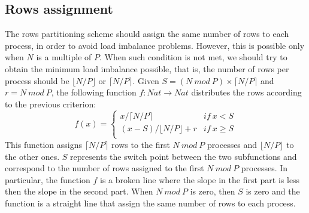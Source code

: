 \documentclass{article}
\begin{document}
\subsection{Rows assignment} \label{sec:rowsassignment}
The rows partitioning scheme should assign the same number of rows to each process, in order to avoid load imbalance problems. However, this is possible only when $N$ is a multiple of $P$. When such condition is not met, we should try to obtain the minimum load imbalance possible, that is, the number of rows per process should be $\lfloor N/P \rfloor$ or $\lceil N/P \rceil$. Given $S = (N~mod~P) \times \lceil N/P \rceil$ and $r = N~mod~P$, the following function $f: Nat \to Nat$ distributes the rows according to the previous criterion:
\[
f(x)=
\begin{cases}
x / \lceil N/P \rceil & if~x < S \\
(x - S) / \lfloor N/P \rfloor + r & if~x \geq S \\
\end{cases}
\]
This function assigns $\lceil N/P \rceil$ rows to the first $N~mod~P$ processes and $\lfloor N/P \rfloor$ to the other ones. $S$ represents the switch point between the two subfunctions and correspond to the number of rows assigned to the first $N~mod~P$ processes. In particular, the function $f$ is a broken line where the slope in the first part is less then the slope in the second part. When $N~mod~P$ is zero, then $S$ is zero and the function is a straight line that assign the same number of rows to each process.
\end{document}
